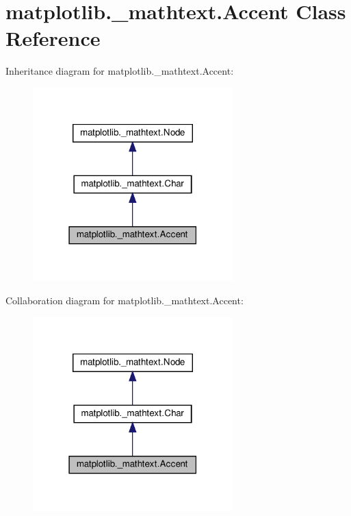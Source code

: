\hypertarget{classmatplotlib_1_1__mathtext_1_1Accent}{}\section{matplotlib.\+\_\+mathtext.\+Accent Class Reference}
\label{classmatplotlib_1_1__mathtext_1_1Accent}


Inheritance diagram for matplotlib.\+\_\+mathtext.\+Accent\+:
\nopagebreak
\begin{figure}[H]
\begin{center}
\leavevmode
\includegraphics[width=219pt]{classmatplotlib_1_1__mathtext_1_1Accent__inherit__graph}
\end{center}
\end{figure}


Collaboration diagram for matplotlib.\+\_\+mathtext.\+Accent\+:
\nopagebreak
\begin{figure}[H]
\begin{center}
\leavevmode
\includegraphics[width=219pt]{classmatplotlib_1_1__mathtext_1_1Accent__coll__graph}
\end{center}
\end{figure}
